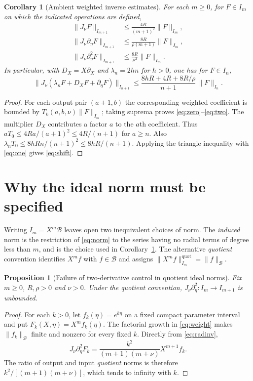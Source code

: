 \documentclass[11pt]{article}
\newtheorem{corollary}[theorem]{Corollary}
\newtheorem{proposition}[theorem]{Proposition}
\begin{document}
\begin{corollary}[Ambient weighted inverse estimates]\label{cor:ambient}
For each $m\ge0$, for $F\in I_m$ on which the indicated operations are defined,
\begin{align}
 \|J_\nu F\|_{I_{m+1}}&\le\frac{4R}{(m+1)^2}\|F\|_{I_m},\label{eq:zero}\\
 \|J_\nu\partial_\eta F\|_{I_{m+1}}&\le\frac{8R}{\rho(m+1)}\|F\|_{I_m},\label{eq:one}\\
 \|J_\nu\partial_\eta^2F\|_{I_{m+1}}&\le\frac{8R}{\rho^2}\|F\|_{I_m}.\label{eq:two}
\end{align}
In particular, with $D_X=X\partial_X$ and $\lambda_n=2hn$ for $h>0$, one has for $F\in I_n$,
\begin{equation}\label{eq:shift}
 \big\|J_\nu(\lambda_n F+D_XF+\partial_\eta F)\big\|_{I_{n+1}}
 \le \frac{8hR+4R+8R/\rho}{n+1}\,\|F\|_{I_n}.
\end{equation}
\end{corollary}
\begin{proof}
For each output pair $(a+1,b)$ the corresponding weighted coefficient is bounded by $T_k(a,b,\nu)\|F\|_{I_m}$; taking suprema proves \eqref{eq:zero}--\eqref{eq:two}. The multiplier $D_X$ contributes a factor $a$ to the $a$th coefficient. Thus $aT_0\le4Ra/(a+1)^2\le4R/(n+1)$ for $a\ge n$. Also $\lambda_nT_0\le8hRn/(n+1)^2\le8hR/(n+1)$. Applying the triangle inequality with \eqref{eq:one} gives \eqref{eq:shift}.
\end{proof}

\section{Why the ideal norm must be specified}
Writing $I_m=X^m\mathcal B$ leaves open two inequivalent choices of norm. The \emph{induced} norm is the restriction of \eqref{eq:norm} to the series having no radial terms of degree less than $m$, and is the choice used in Corollary~\ref{cor:ambient}. The alternative \emph{quotient} convention identifies $X^m f$ with $f\in\mathcal B$ and assigns $\|X^mf\|_{I_m}^{\mathrm{quot}}=\|f\|_{\mathcal B}$.

\begin{proposition}[Failure of two-derivative control in quotient ideal norms]\label{prop:quotient}
Fix $m\ge0$, $R,\rho>0$ and $\nu>0$. Under the quotient convention, $J_\nu\partial_\eta^2:I_m\to I_{m+1}$ is unbounded.
\end{proposition}
\begin{proof}
For each $k>0$, let $f_k(\eta)=e^{k\eta}$ on a fixed compact parameter interval and put $F_k(X,\eta)=X^m f_k(\eta)$. The factorial growth in \eqref{eq:weight} makes $\|f_k\|_{\mathcal B}$ finite and nonzero for every fixed $k$. Directly from \eqref{eq:radinv},
\[
 J_\nu\partial_\eta^2F_k
 =\frac{k^2}{(m+1)(m+\nu)}X^{m+1}f_k.
\]
The ratio of output and input \emph{quotient} norms is therefore $k^2/[(m+1)(m+\nu)]$, which tends to infinity with $k$.
\end{proof}
\end{document}

